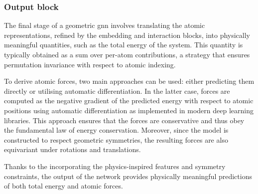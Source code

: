 \subsubsection{Output block}
The final stage of a geometric \ac{gnn} involves translating the atomic representations, refined by the embedding and interaction blocks, into physically meaningful quantities, such as the total energy of the system. This quantity is typically obtained as a sum over per-atom contributions, a strategy that ensures permutation invariance with respect to atomic indexing.

To derive atomic forces, two main approaches can be used: either predicting them directly or utilising automatic differentiation. In the latter case, forces are computed as the negative gradient of the predicted energy with respect to atomic positions using automatic differentiation as implemented in modern deep learning libraries. This approach ensures that the forces are conservative and thus obey the fundamental law of energy conservation. Moreover, since the model is constructed to respect geometric symmetries, the resulting forces are also equivariant under rotations and translations.

Thanks to the incorporating the physics-inspired features and symmetry constraints, the output of the network provides physically meaningful predictions of both total energy and atomic forces.